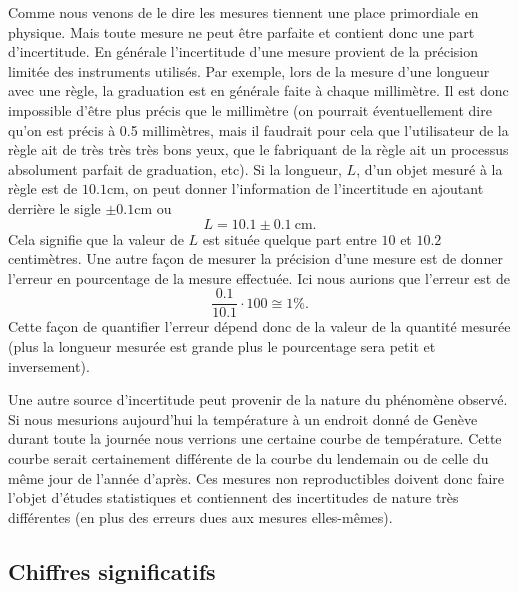 \documentclass[a4paper,12pt]{book}
\newcommand{\cm}{\mathrm{cm}}
\begin{document}
Comme nous venons de le dire les mesures tiennent une place primordiale en physique. Mais toute mesure ne peut être 
parfaite et contient donc une part d'incertitude. En générale l'incertitude d'une mesure provient 
de la précision limitée des instruments utilisés. Par exemple, lors de la mesure d'une longueur avec une règle,
la graduation est en générale faite à chaque millimètre. Il est donc impossible d'être plus précis
que le millimètre (on pourrait éventuellement dire qu'on est précis à 0.5 millimètres, mais il faudrait pour cela que l'utilisateur de la 
règle ait de très très très bons yeux, que le fabriquant de la règle ait un processus absolument parfait de graduation, etc).
Si la longueur, $L$, d'un objet mesuré à la règle est de $10.1\cm$, on peut donner l'information de l'incertitude 
en ajoutant derrière le sigle $\pm 0.1\cm$ ou
\begin{equation*}
 L=10.1\pm0.1\ \cm.
\end{equation*}
Cela signifie que la valeur de $L$ est située quelque part entre $10$ et $10.2$ centimètres.
Une autre façon de mesurer la précision d'une mesure est de donner l'erreur en pourcentage de la mesure effectuée.
Ici nous aurions que l'erreur est de
\begin{equation*}
 \frac{0.1}{10.1}\cdot 100\cong 1\%.
\end{equation*}
Cette façon de quantifier l'erreur dépend donc de la valeur de la quantité mesurée (plus la longueur mesurée est grande plus
le pourcentage sera petit et inversement).


Une autre source d'incertitude peut provenir de la nature du phénomène observé. Si nous mesurions aujourd'hui la température 
à un endroit donné de Genève durant toute la journée nous verrions une certaine courbe de température. Cette courbe serait certainement
différente de la courbe du lendemain ou de celle du même jour de l'année d'après. Ces mesures non reproductibles 
doivent donc faire l'objet d'études statistiques et contiennent des incertitudes de nature très différentes (en plus des erreurs dues aux mesures
elles-mêmes).

\subsection{Chiffres significatifs}
\end{document}
